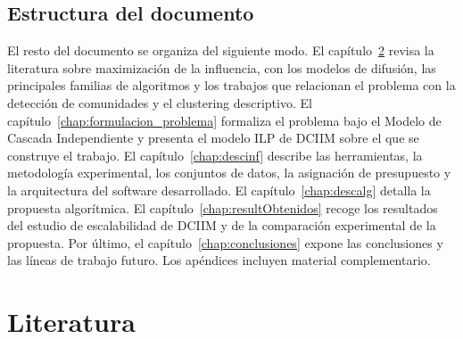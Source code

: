 \documentclass[12pt,twoside,titlepage]{report}
\begin{document}
\section{Estructura del documento} \label{sec:estructura}


El resto del documento se organiza del siguiente modo.
El capítulo~\ref{chap:lit} revisa la literatura sobre maximización de la influencia, con los modelos de difusión, las principales familias de algoritmos y los trabajos que relacionan el problema con la detección de comunidades y el clustering descriptivo.
El capítulo~\ref{chap:formulacion_problema} formaliza el problema bajo el Modelo de Cascada Independiente y presenta el modelo ILP de DCIIM sobre el que se construye el trabajo.
El capítulo~\ref{chap:descinf} describe las herramientas, la metodología experimental, los conjuntos de datos, la asignación de presupuesto y la arquitectura del software desarrollado.
El capítulo~\ref{chap:descalg} detalla la propuesta algorítmica.
El capítulo~\ref{chap:resultObtenidos} recoge los resultados del estudio de escalabilidad de DCIIM y de la comparación experimental de la propuesta.
Por último, el capítulo~\ref{chap:conclusiones} expone las conclusiones y las líneas de trabajo futuro.
Los apéndices incluyen material complementario.



\chapter{Literatura} \label{chap:lit}



\end{document}
